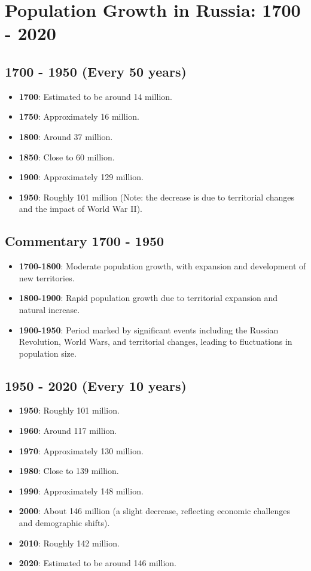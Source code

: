 \section{Population Growth in Russia: 1700 - 2020}

\subsection*{1700 - 1950 (Every 50 years)}
\begin{itemize}
    \item \textbf{1700}: Estimated to be around 14 million.
    \item \textbf{1750}: Approximately 16 million.
    \item \textbf{1800}: Around 37 million.
    \item \textbf{1850}: Close to 60 million.
    \item \textbf{1900}: Approximately 129 million.
    \item \textbf{1950}: Roughly 101 million (Note: the decrease is due to territorial changes and the impact of World War II).
\end{itemize}

\subsection*{Commentary 1700 - 1950}
\begin{itemize}
    \item \textbf{1700-1800}: Moderate population growth, with expansion and development of new territories.
    \item \textbf{1800-1900}: Rapid population growth due to territorial expansion and natural increase.
    \item \textbf{1900-1950}: Period marked by significant events including the Russian Revolution, World Wars, and territorial changes, leading to fluctuations in population size.
\end{itemize}

\subsection*{1950 - 2020 (Every 10 years)}
\begin{itemize}
    \item \textbf{1950}: Roughly 101 million.
    \item \textbf{1960}: Around 117 million.
    \item \textbf{1970}: Approximately 130 million.
    \item \textbf{1980}: Close to 139 million.
    \item \textbf{1990}: Approximately 148 million.
    \item \textbf{2000}: About 146 million (a slight decrease, reflecting economic challenges and demographic shifts).
    \item \textbf{2010}: Roughly 142 million.
    \item \textbf{2020}: Estimated to be around 146 million.
\end{itemize}

